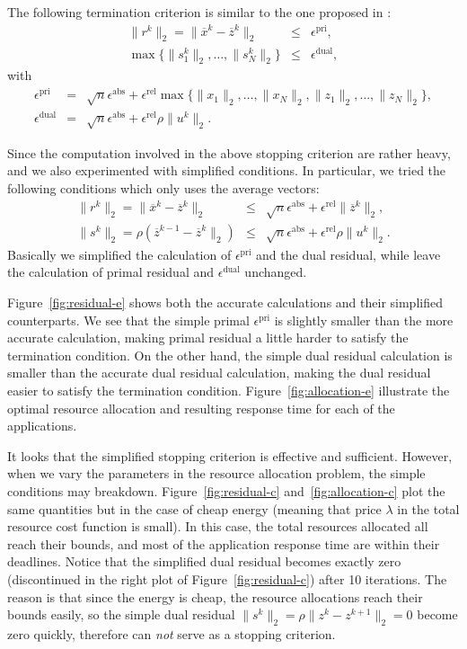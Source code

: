 The following termination criterion is similar to the one proposed in
\cite[\S3.3]{ADMM}:
\begin{eqnarray*}
\|r^k\|_2 = \|\overline x^k - \overline z^k\|_2 &\leq& \epsilon^\mathrm{pri},\\
\max \{\|s_1^k\|_2,\ldots,\|s_N^k\|_2 \} &\leq& \epsilon^\mathrm{dual},
\end{eqnarray*}
with
\begin{eqnarray*}
\epsilon^\mathrm{pri} &=& \sqrt{n}\epsilon^\mathrm{abs} + \epsilon^\mathrm{rel}
    \max\{\|x_1\|_2,\ldots,\|x_N\|_2,\|z_1\|_2,\ldots,\|z_N\|_2\} ,\\
\epsilon^\mathrm{dual} &=& \sqrt{n}\epsilon^\mathrm{abs} +\epsilon^\mathrm{rel}
    \rho\|u^k\|_2.
\end{eqnarray*}


Since the computation involved in the above stopping criterion are 
rather heavy, and we also experimented with simplified conditions.
In particular, we tried the following conditions 
which only uses the average vectors:
\begin{eqnarray*}
\|r^k\|_2=\|\overline x^k - \overline z^k\|_2 
&\leq& \sqrt{n}\epsilon^\mathrm{abs}+\epsilon^\mathrm{rel}\|\overline z^k\|_2,\\
\|s^k\|_2 = \rho(\overline z^{k-1}-\overline z^k\|_2)
&\leq& \sqrt{n}\epsilon^\mathrm{abs} +\epsilon^\mathrm{rel}\rho \|u^k\|_2 .
\end{eqnarray*}
Basically we simplified the calculation of $\epsilon^\mathrm{pri}$ and
the dual residual, while leave the calculation of primal residual and
$\epsilon^\mathrm{dual}$ unchanged.

Figure~\ref{fig:residual-e} shows both the accurate calculations and their
simplified counterparts.
We see that the simple primal $\epsilon^\mathrm{pri}$ is slightly smaller
than the more accurate calculation, making primal residual a little harder to
satisfy the termination condition. 
On the other hand, the simple dual residual calculation is smaller than
the accurate dual residual calculation, making the dual residual easier to
satisfy the termination condition.
Figure~\ref{fig:allocation-e} illustrate the optimal resource allocation 
and resulting response time for each of the applications.

It looks that the simplified stopping criterion is effective and 
sufficient.
However, when we vary the parameters in the resource allocation problem, 
the simple conditions may breakdown.
Figure~\ref{fig:residual-c} and~\ref{fig:allocation-c} 
plot the same quantities but in the case of cheap energy (meaning that
price $\lambda$ in the total resource cost function is small).
In this case, the total resources allocated all reach their bounds, 
and most of the application response time are within their deadlines.
Notice that the simplified dual residual becomes exactly zero 
(discontinued in the right plot of Figure~\ref{fig:residual-c}) 
after 10 iterations.
The reason is that since the energy is cheap, the resource allocations 
reach their bounds easily,
so the simple dual residual $\|s^k\|_2=\rho\|z^{k}-z^{k+1}\|_2=0$ 
become zero quickly, therefore can \emph{not} serve as a stopping criterion.


